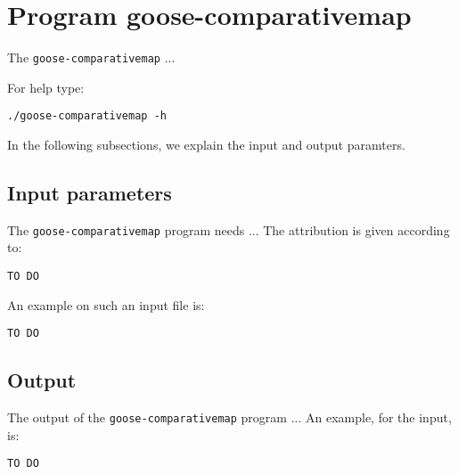 \section{Program goose-comparativemap}
The \texttt{goose-comparativemap} ...

For help type:
\begin{lstlisting}
./goose-comparativemap -h
\end{lstlisting}
In the following subsections, we explain the input and output paramters.

\subsection{Input parameters}

The \texttt{goose-comparativemap} program needs ...
The attribution is given according to:
\begin{lstlisting}
TO DO
\end{lstlisting}

An example on such an input file is:
\begin{lstlisting}
TO DO
\end{lstlisting}

\subsection{Output}
The output of the \texttt{goose-comparativemap} program ...
An example, for the input, is:
\begin{lstlisting}
TO DO
\end{lstlisting}